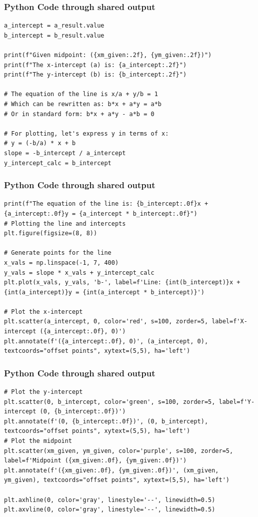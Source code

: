\documentclass{beamer}
\begin{document}
\begin{frame}[fragile]
\frametitle{Python Code through shared output}
\begin{lstlisting}
a_intercept = a_result.value
b_intercept = b_result.value

print(f"Given midpoint: ({xm_given:.2f}, {ym_given:.2f})")
print(f"The x-intercept (a) is: {a_intercept:.2f}")
print(f"The y-intercept (b) is: {b_intercept:.2f}")

# The equation of the line is x/a + y/b = 1
# Which can be rewritten as: b*x + a*y = a*b
# Or in standard form: b*x + a*y - a*b = 0

# For plotting, let's express y in terms of x:
# y = (-b/a) * x + b
slope = -b_intercept / a_intercept
y_intercept_calc = b_intercept
\end{lstlisting}
\end{frame}

\begin{frame}[fragile]
\frametitle{Python Code through shared output}
\begin{lstlisting}
print(f"The equation of the line is: {b_intercept:.0f}x + {a_intercept:.0f}y = {a_intercept * b_intercept:.0f}")
# Plotting the line and intercepts
plt.figure(figsize=(8, 8))

# Generate points for the line
x_vals = np.linspace(-1, 7, 400)
y_vals = slope * x_vals + y_intercept_calc
plt.plot(x_vals, y_vals, 'b-', label=f'Line: {int(b_intercept)}x + {int(a_intercept)}y = {int(a_intercept * b_intercept)}')

# Plot the x-intercept
plt.scatter(a_intercept, 0, color='red', s=100, zorder=5, label=f'X-intercept ({a_intercept:.0f}, 0)')
plt.annotate(f'({a_intercept:.0f}, 0)', (a_intercept, 0), textcoords="offset points", xytext=(5,5), ha='left')
\end{lstlisting}
\end{frame}

\begin{frame}[fragile]
\frametitle{Python Code through shared output}
\begin{lstlisting}
# Plot the y-intercept
plt.scatter(0, b_intercept, color='green', s=100, zorder=5, label=f'Y-intercept (0, {b_intercept:.0f})')
plt.annotate(f'(0, {b_intercept:.0f})', (0, b_intercept), textcoords="offset points", xytext=(5,5), ha='left')
# Plot the midpoint
plt.scatter(xm_given, ym_given, color='purple', s=100, zorder=5, label=f'Midpoint ({xm_given:.0f}, {ym_given:.0f})')
plt.annotate(f'({xm_given:.0f}, {ym_given:.0f})', (xm_given, ym_given), textcoords="offset points", xytext=(5,5), ha='left')

plt.axhline(0, color='gray', linestyle='--', linewidth=0.5)
plt.axvline(0, color='gray', linestyle='--', linewidth=0.5)
\end{lstlisting}
\end{frame}
\end{document}
